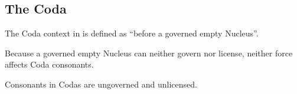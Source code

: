 \subsection{The Coda}

The Coda context in \CVCV is defined as
\enquote{before a governed empty Nucleus}.

Because a governed empty Nucleus can neither govern nor license,
neither force affects Coda consonants.

Consonants in Codas are ungoverned and unlicensed. \parencite[p.~659]{scheer2004}
